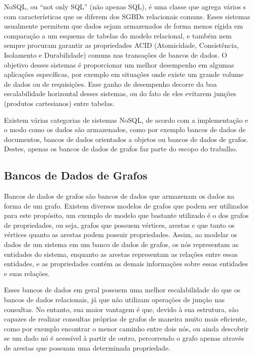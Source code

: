 NoSQL, ou ``not only SQL'' (não apenas SQL), é uma classe que agrega vários s com características que os diferem dos SGBDs relacionais comuns.
Esses sistemas usualmente permitem que dados sejam armazenados de forma menos rígida em comparação a um esquema de tabelas do modelo relacional, e também nem sempre procuram garantir as propriedades ACID (Atomicidade, Consistência, Isolamento e Durabilidade) comuns nas transações de bancos de dados.
O objetivo desses sistemas é proporcionar um melhor desempenho em algumas aplicações específicas, por exemplo em situações onde existe um grande volume de dados ou de requisições. Esse ganho de desempenho decorre da boa escalabilidade horizontal desses sistemas, ou do fato de eles evitarem junções (produtos cartesianos) entre tabelas.

Existem várias categorias de sistemas NoSQL, de acordo com a implementação e o modo como os dados são armazenados, como por exemplo bancos de dados de documentos, bancos de dados orientados a objetos ou bancos de dados de grafos.
Destes, apenas os bancos de dados de grafos faz parte do escopo do trabalho.

\subsection{Bancos de Dados de Grafos}


Bancos de dados de grafos são bancos de dados que armazenam os dados na forma de um grafo. Existem diversos modelos de grafos que podem ser utilizados para este propósito, um exemplo de modelo que bastante utilizado é o dos grafos de propriedades, ou seja, grafos que possuem vértices, arestas e que tanto os vértices quanto as arestas podem possuir propriedades.
Assim, ao modelar os dados de um sistema em um banco de dados de grafos, os nós representam as entidades do sistema, enquanto as arestas representam as relações entre essas entidades, e as propriedades contém as demais informações sobre essas entidades e suas relações.


Esses bancos de dados em geral possuem uma melhor escalabilidade do que os bancos de dados relacionais, já que não utilizam operações de junção nas consultas.
No entanto, sua maior vantagem é que, devido à sua estrutura, são capazes de realizar consultas próprias de grafos de maneira muito mais eficiente, como por exemplo encontrar o menor caminho entre dois nós, ou ainda descobrir se um dado nó é acessível à partir de outro, percorrendo o grafo apenas através de arestas que possuam uma determinada propriedade.

